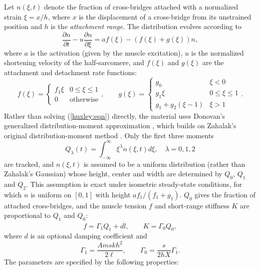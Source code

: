 Let $n(\xi, t)$ denote the fraction of cross-bridges attached with a
normalized strain $\xi = x/h$, where $x$ is the displacement of a
cross-bridge from its unstrained position and $h$ is the {\it
attachment range}. The distribution evolves according to
%
\begin{equation}
\frac{\partial n}{\partial t} - u \frac{\partial n}{\partial \xi}
= a f(\xi) - (f(\xi) + g(\xi)) n,
\label{huxley:eqn}
\end{equation}
%
where $a$ is the activation (given by the muscle excitation), $u$ is
the normalized shortening velocity of the half-sarcomere, and
$f(\xi)$ and $g(\xi)$ are the attachment and detachment rate
functions:
%
\begin{equation*}
f(\xi) = \begin{cases}
f_1 \xi & 0 \le \xi \le 1 \\
0 & \text{otherwise}
\end{cases},
\qquad
g(\xi) = \begin{cases}
g_0 & \xi < 0 \\
g_1 \xi & 0 \le \xi \le 1 \\
g_1 + g_2 (\xi - 1) & \xi > 1
\end{cases}.
\end{equation*}
%
Rather than solving (\ref{huxley:eqn}) directly, the material uses
Donovan's generalized distribution-moment approximation
\cite{donovan2020generalized}, which builds on Zahalak's original
distribution-moment method \cite{zahalak1981distribution}. Only the
first three moments
%
\begin{equation*}
Q_\lambda(t) = \int_{-\infty}^{\infty} \xi^\lambda n(\xi, t) d\xi,
\quad \lambda = 0, 1, 2
\end{equation*}
%
are tracked, and $n(\xi, t)$ is assumed to be a uniform distribution
(rather than Zahalak's Gaussian) whose height, center and width are
determined by $Q_0$, $Q_1$ and $Q_2$. This assumption is exact under isometric steady-state
conditions, for which $n$ is uniform on $[0, 1]$ with height $a f_1
/(f_1 + g_1)$. $Q_0$ gives the fraction of attached cross-bridges,
and the muscle tension $f$ and short-range stiffness $K$ are
proportional to $Q_1$ and $Q_0$:
%
\begin{equation*}
f = \Gamma_1 Q_1 + d \dot l, \qquad K = \Gamma_0 Q_0,
\end{equation*}
%
where $d$ is an optional damping coefficient and
%
\begin{equation*}
\Gamma_1 = \frac{A m s k h^2}{2 \ell}, \qquad
\Gamma_0 = \frac{s}{2 h X} \Gamma_1.
\end{equation*}
%
The parameters are specified by the following properties:

